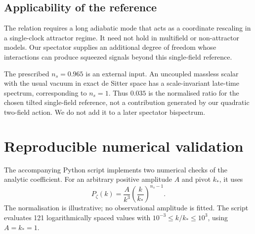 \documentclass[11pt,a4paper]{article}
\begin{document}
\subsection{Applicability of the reference}
The relation requires a long adiabatic mode that acts as a coordinate rescaling in a single-clock attractor regime. It need not hold in multifield or non-attractor models. Our spectator supplies an additional degree of freedom whose interactions can produce squeezed signals beyond this single-field reference.

The prescribed $n_s=0.965$ is an external input. An uncoupled massless scalar with the usual vacuum in exact de Sitter space has a scale-invariant late-time spectrum, corresponding to $n_s=1$. Thus $0.035$ is the normalised ratio for the chosen tilted single-field reference, not a contribution generated by our quadratic two-field action. We do not add it to a later spectator bispectrum.

\newpage
\section{Reproducible numerical validation}
The accompanying Python script implements two numerical checks of the analytic coefficient. For an arbitrary positive amplitude $A$ and pivot $k_*$, it uses
\begin{equation}
P_\zeta(k)=\frac{A}{k^3}\left(\frac{k}{k_*}\right)^{n_s-1}.
\end{equation}
The normalisation is illustrative; no observational amplitude is fitted. The script evaluates 121 logarithmically spaced values with $10^{-3}\leq k/k_*\leq10^3$, using $A=k_*=1$.
\end{document}
